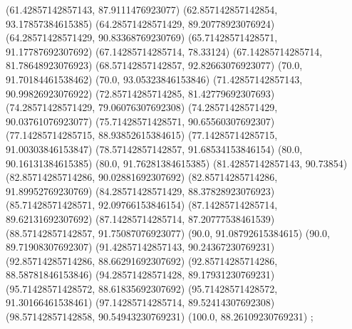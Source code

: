 {{{		(61.42857142857143, 87.9111476923077)
		(62.857142857142854, 93.17857384615385)
		(64.28571428571429, 89.20778923076924)
		(64.28571428571429, 90.83368769230769)
		(65.71428571428571, 91.17787692307692)
		(67.14285714285714, 78.33124)
		(67.14285714285714, 81.78648923076923)
		(68.57142857142857, 92.82663076923077)
		(70.0, 91.70184461538462)
		(70.0, 93.05323846153846)
		(71.42857142857143, 90.99826923076922)
		(72.85714285714285, 81.42779692307693)
		(74.28571428571429, 79.06076307692308)
		(74.28571428571429, 90.03761076923077)
		(75.71428571428571, 90.65560307692307)
		(77.14285714285715, 88.93852615384615)
		(77.14285714285715, 91.00303846153847)
		(78.57142857142857, 91.68534153846154)
		(80.0, 90.16131384615385)
		(80.0, 91.76281384615385)
		(81.42857142857143, 90.73854)
		(82.85714285714286, 90.02881692307692)
		(82.85714285714286, 91.89952769230769)
		(84.28571428571429, 88.37828923076923)
		(85.71428571428571, 92.09766153846154)
		(87.14285714285714, 89.62131692307692)
		(87.14285714285714, 87.20777538461539)
		(88.57142857142857, 91.75087076923077)
		(90.0, 91.08792615384615)
		(90.0, 89.71908307692307)
		(91.42857142857143, 90.24367230769231)
		(92.85714285714286, 88.66291692307692)
		(92.85714285714286, 88.58781846153846)
		(94.28571428571428, 89.17931230769231)
		(95.71428571428572, 88.61835692307692)
		(95.71428571428572, 91.30166461538461)
		(97.14285714285714, 89.52414307692308)
		(98.57142857142858, 90.54943230769231)
		(100.0, 88.26109230769231)
	};

}}
